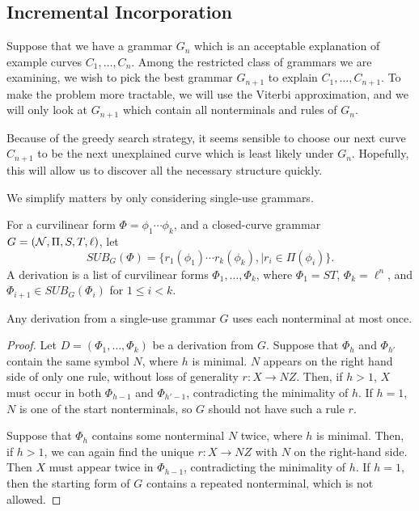 \subsection{Incremental Incorporation}

Suppose that we have a grammar $G_n$ which is an acceptable
explanation of example curves $C_1,\dots, C_n$.  Among the restricted
class of grammars we are examining, we wish to pick the best grammar
$G_{n+1}$ to explain $C_1,\dots, C_{n+1}$. To make the problem more
tractable, we will use the Viterbi approximation, and we will only
look at $G_{n+1}$ which contain all nonterminals and rules of $G_n$.

Because of the greedy search strategy, it seems sensible
to choose our next curve $C_{n+1}$ to be the next unexplained
curve which is least likely under $G_n$. Hopefully, this will
allow us to discover all the necessary structure quickly.

We simplify matters by only considering single-use grammars.

\begin{defn}
For a curvilinear form $\Phi = \phi_1 \cdots \phi_k$, and a
closed-curve grammar $G = ({\mathcal N},\Pi,S,T,\ell)$, let $$SUB_G(\Phi) = \{
r_1(\phi_1) \cdots r_k (\phi_k),\mid r_i \in \Pi(\phi_i) \}.$$ A derivation is
a list of curvilinear forms $\Phi_1,\dots, \Phi_k$, where $\Phi_1 =
ST$, $\Phi_k = \ell^n$, and $\Phi_{i+1} \in SUB_G(\Phi_i)$ for $1\le i
< k$.
\end{defn}

\begin{lem}
Any derivation from a single-use grammar $G$ uses each nonterminal at
most once. 
\end{lem}
\begin{proof}
Let $D = (\Phi_1, \dots, \Phi_k)$ be a derivation from $G$.  Suppose
that $\Phi_h$ and $\Phi_{h'}$ contain the same symbol $N$, where $h$
is minimal. $N$ appears on the right hand side of only one rule,
without loss of generality $r : X \to N Z$. Then, if $h>1$, $X$ must
occur in both $\Phi_{h-1}$ and $\Phi_{h'-1}$, contradicting the
minimality of $h$. If $h=1$, $N$ is one of the start nonterminals, so
$G$ should not have such a rule $r$.

Suppose that $\Phi_h$ contains some nonterminal $N$ twice, where $h$
is minimal. Then, if $h>1$, we can again find the unique $r : X \to N
Z$ with $N$ on the right-hand side. Then $X$ must appear twice in
$\Phi_{h-1}$, contradicting the minimality of $h$. If $h=1$, then the
starting form of $G$ contains a repeated nonterminal, which is not
allowed.
\end{proof}

